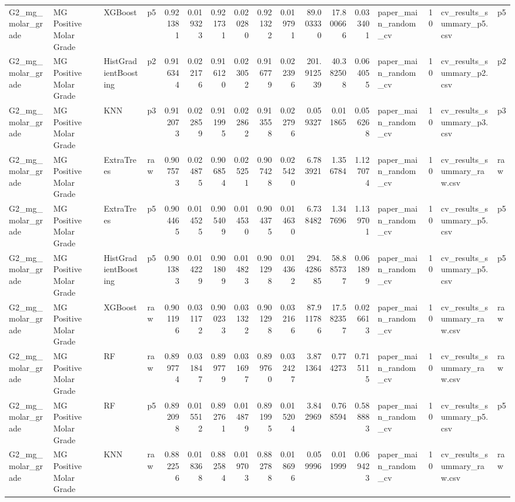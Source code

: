 \begin{tabular}{llllrrrrrrrrrlrll}
G2_mg_molar_grade & MG Positive Molar Grade & XGBoost & p5 & 0.921381 & 0.019323 & 0.921731 & 0.020280 & 0.921322 & 0.019791 & 89.003330 & 17.800666 & 0.033401 & paper_main_random_cv & 10 & cv_results_summary_p5.csv & p5 \\
G2_mg_molar_grade & MG Positive Molar Grade & HistGradientBoosting & p2 & 0.916344 & 0.022176 & 0.916120 & 0.023052 & 0.916779 & 0.022396 & 201.912539 & 40.382508 & 0.064055 & paper_main_random_cv & 10 & cv_results_summary_p2.csv & p2 \\
G2_mg_molar_grade & MG Positive Molar Grade & KNN & p3 & 0.912073 & 0.022859 & 0.911995 & 0.022862 & 0.913558 & 0.022796 & 0.059327 & 0.011865 & 0.056268 & paper_main_random_cv & 10 & cv_results_summary_p3.csv & p3 \\
G2_mg_molar_grade & MG Positive Molar Grade & ExtraTrees & raw & 0.907573 & 0.024875 & 0.906854 & 0.025251 & 0.907428 & 0.025420 & 6.783921 & 1.356784 & 1.127074 & paper_main_random_cv & 10 & cv_results_summary_raw.csv & raw \\
G2_mg_molar_grade & MG Positive Molar Grade & ExtraTrees & p5 & 0.904465 & 0.014525 & 0.905409 & 0.014530 & 0.904375 & 0.014630 & 6.738482 & 1.347696 & 1.139701 & paper_main_random_cv & 10 & cv_results_summary_p5.csv & p5 \\
G2_mg_molar_grade & MG Positive Molar Grade & HistGradientBoosting & p5 & 0.901383 & 0.014229 & 0.901809 & 0.014823 & 0.901298 & 0.014362 & 294.428685 & 58.885737 & 0.061899 & paper_main_random_cv & 10 & cv_results_summary_p5.csv & p5 \\
G2_mg_molar_grade & MG Positive Molar Grade & XGBoost & raw & 0.901196 & 0.031172 & 0.900233 & 0.031322 & 0.901298 & 0.032166 & 87.911786 & 17.582357 & 0.026613 & paper_main_random_cv & 10 & cv_results_summary_raw.csv & raw \\
G2_mg_molar_grade & MG Positive Molar Grade & RF & raw & 0.899774 & 0.031847 & 0.899779 & 0.031697 & 0.899760 & 0.032427 & 3.871364 & 0.774273 & 0.715115 & paper_main_random_cv & 10 & cv_results_summary_raw.csv & raw \\
G2_mg_molar_grade & MG Positive Molar Grade & RF & p5 & 0.892098 & 0.015512 & 0.892761 & 0.014879 & 0.891995 & 0.015204 & 3.842969 & 0.768594 & 0.588883 & paper_main_random_cv & 10 & cv_results_summary_p5.csv & p5 \\
G2_mg_molar_grade & MG Positive Molar Grade & KNN & raw & 0.882256 & 0.018368 & 0.882584 & 0.019703 & 0.882788 & 0.018696 & 0.059996 & 0.011999 & 0.069423 & paper_main_random_cv & 10 & cv_results_summary_raw.csv & raw \\

\end{tabular}
